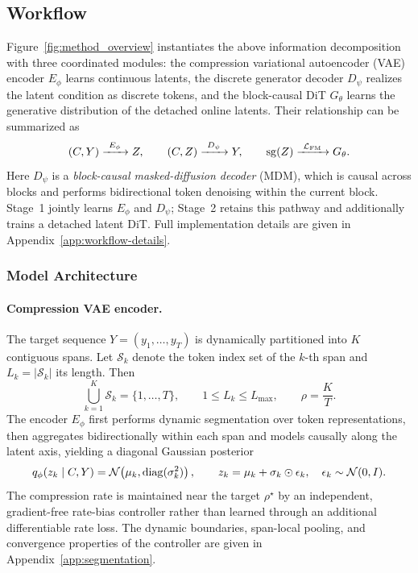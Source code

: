 \subsection{Workflow}
\label{sec:workflow}

Figure~\ref{fig:method_overview} instantiates the above information decomposition with three coordinated modules: the compression variational autoencoder (VAE) encoder $E_\phi$ learns continuous latents, the discrete generator decoder $D_\psi$ realizes the latent condition as discrete tokens, and the block-causal DiT $G_\theta$ learns the generative distribution of the detached online latents. Their relationship can be summarized as
\begin{equation}
    (C,Y)\xrightarrow{\ E_\phi\ } Z,
    \qquad
    (C,Z)\xrightarrow{\ D_\psi\ }Y,
    \qquad
    \operatorname{sg}(Z)\xrightarrow{\ \mathcal{L}_{\mathrm{FM}}\ }G_\theta.
    \label{eq:workflow-overview}
\end{equation}
Here $D_\psi$ is a \emph{block-causal masked-diffusion decoder} (MDM), which is causal across blocks and performs bidirectional token denoising within the current block. Stage~1 jointly learns $E_\phi$ and $D_\psi$; Stage~2 retains this pathway and additionally trains a detached latent DiT. Full implementation details are given in Appendix~\ref{app:workflow-details}.

\subsubsection{Model Architecture}
\label{subsec:workflow-arch}

\paragraph{Compression VAE encoder.}
The target sequence $Y=(y_1,\ldots,y_T)$ is dynamically partitioned into $K$ contiguous spans. Let $\mathcal S_k$ denote the token index set of the $k$-th span and $L_k=|\mathcal S_k|$ its length. Then
\begin{equation}
    \bigcup_{k=1}^{K}\mathcal S_k=\{1,\ldots,T\},
    \qquad
    1\le L_k\le L_{\max},
    \qquad
    \rho=\frac{K}{T}.
    \label{eq:workflow-spans}
\end{equation}
The encoder $E_\phi$ first performs dynamic segmentation over token representations, then aggregates bidirectionally within each span and models causally along the latent axis, yielding a diagonal Gaussian posterior
\begin{equation}
    q_\phi(z_k\mid C,Y)
    =\mathcal{N}\!\left(\mu_k,\operatorname{diag}(\sigma_k^2)\right),
    \qquad
    z_k=\mu_k+\sigma_k\odot\epsilon_k,
    \quad \epsilon_k\sim\mathcal{N}(0,I).
    \label{eq:workflow-posterior}
\end{equation}
The compression rate is maintained near the target $\rho^\star$ by an independent, gradient-free rate-bias controller rather than learned through an additional differentiable rate loss. The dynamic boundaries, span-local pooling, and convergence properties of the controller are given in Appendix~\ref{app:segmentation}.

